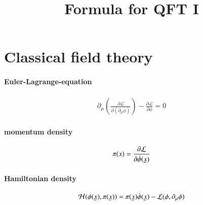\documentclass{scrartcl}
\title{Formula for QFT I}
\newcommand{\utilde}[1]{\underaccent{\tilde}{#1}}
\newcommand{\lag}{\mathcal{L}}
\newcommand{\ham}{\mathcal{H}}
\begin{document}
\maketitle

\section{Classical field theory}
\paragraph{Euler-Lagrange-equation}
\begin{align}
	\partial_\mu \left( \frac{\partial \lag}{\partial(\partial_\mu \phi)} \right) - \frac{\partial \mathcal{L}}{\partial \phi} = 0
\end{align}
\paragraph{momentum density}
\begin{align}
	\pi(x) = \frac{\partial \lag}{\partial \dot{\phi}(\utilde{x})}
\end{align}
\paragraph{Hamiltonian density}
\begin{align}
	\ham(\phi(\utilde{x}),\pi(\utilde{x})) = \pi(\utilde{x}) \dot{\phi}(\utilde{x}) - \lag(\phi,\partial_\mu \phi)
\end{align}
\end{document}
